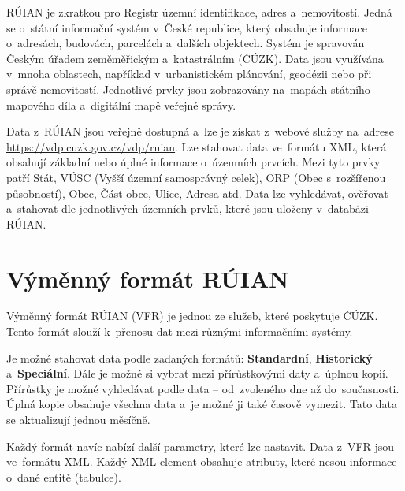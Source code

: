 RÚIAN je zkratkou pro Registr územní identifikace, adres a~nemovitostí. 
Jedná se o~státní informační systém v~České republice, který obsahuje informace o~adresách, budovách, parcelách a~dalších objektech. 
Systém je spravován Českým úřadem zeměměřickým a~katastrálním (ČÚZK). 
Data jsou využívána v~mnoha oblastech, například v~urbanistickém plánování, geodézii nebo při správě nemovitostí. 
Jednotlivé prvky jsou zobrazovány na~mapách státního mapového díla a~digitální mapě veřejné správy.

Data z~RÚIAN jsou veřejně dostupná a~lze je získat z~webové služby na~adrese \url{https://vdp.cuzk.gov.cz/vdp/ruian}. 
Lze stahovat data ve~formátu XML, která obsahují základní nebo úplné informace o~územních prvcích. 
Mezi tyto prvky patří Stát, VÚSC (Vyšší územní samosprávný celek), ORP (Obec s~rozšířenou působností), Obec, Část obce, Ulice, Adresa atd. 
Data lze vyhledávat, ověřovat a~stahovat dle jednotlivých územních prvků, které jsou uloženy v~databázi RÚIAN.

\section{Výměnný formát RÚIAN}
Výměnný formát RÚIAN (VFR) je jednou ze služeb, které poskytuje ČÚZK. 
Tento formát slouží k~přenosu dat mezi různými informačními systémy.

Je možné stahovat data podle zadaných formátů: \textbf{Standardní}, \textbf{Historický} a~\textbf{Speciální}. 
Dále je možné si vybrat mezi přírůstkovými daty a~úplnou kopií. 
Přírůstky je možné vyhledávat podle data -- od~zvoleného dne až do~současnosti. 
Úplná kopie obsahuje všechna data a~je možné ji také časově vymezit. Tato data se aktualizují jednou měsíčně. 

Každý formát navíc nabízí další parametry, které lze nastavit. 
Data z~VFR jsou ve~formátu XML. 
Každý XML element obsahuje atributy, které nesou informace o~dané entitě (tabulce).

\newpage

